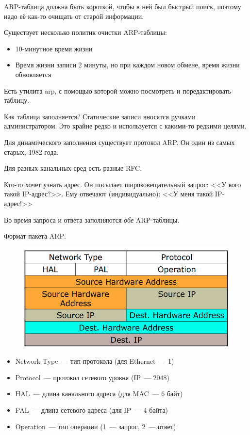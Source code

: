 ARP-таблица должна быть короткой, чтобы в ней был быстрый поиск, поэтому надо её как-то очищать от старой информации. 

Существует несколько политик очистки ARP-таблицы:
\begin{itemize}
    \item 10-минутное время жизни
    \item Время жизни записи 2 минуты, но при каждом новом обмене, время жизни обновляется
\end{itemize}

Есть утилита arp, с помощью которой можно посмотреть и поредактировать таблицу.

Как таблица заполняется? Статические записи вносятся ручками администратором. Это крайне редко и используется с какими-то редкими целями.


Для динамического заполнения существует протокол ARP. Он один из самых старых, 1982 года. 

Для разных канальных сред есть разные RFC.

Кто-то хочет узнать адрес. Он посылает широковещательный запрос: <<У кого такой IP-адрес?>>. Ему отвечают (индивидуально): <<У меня такой IP-адрес!>>

Во время запроса и ответа заполняются {\it обе} ARP-таблицы.

Формат пакета ARP:

\begin{figure}[H]
  \centering
  \includegraphics[width=15cm]{images/02/06}
\end{figure}

\begin{itemize}
    \item Network Type~--- тип протокола (для Ethernet~--- 1)
    \item Protocol~--- протокол сетевого уровня (IP~--- 2048)
    \item HAL~--- длина канального адреса (для MAC~--- 6 байт)
    \item PAL~--- длина сетевого адреса (для IP~--- 4 байта)
    \item Operation~--- тип операции (1~--- запрос, 2~--- ответ)
\end{itemize}

